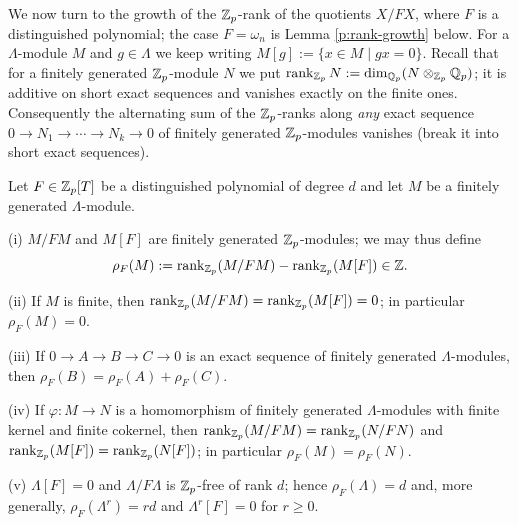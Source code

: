 We now turn to the growth of the ${\mathbb {Z}}_p$-rank of the quotients $X/FX$, where
$F$ is a distinguished polynomial; the case $F=\omega_n$ is
Lemma \ref{p:rank-growth} below.
For a $\Lambda$-module $M$ and $g\in\Lambda$ we keep writing
$M[g]:=\{x\in M\mid gx=0\}$.
Recall that for a finitely generated ${\mathbb {Z}}_p$-module $N$ we put
$\operatorname{rank}_{{\mathbb {Z}}_p}N:=\dim_{{\mathbb {Q}}_p}(N\otimes_{{\mathbb {Z}}_p}{\mathbb {Q}}_p)$; it is additive on short
exact sequences and vanishes exactly on the finite ones.
Consequently the alternating sum of the ${\mathbb {Z}}_p$-ranks along \emph{any} exact
sequence $0\to N_1\to\cdots\to N_k\to 0$ of finitely generated ${\mathbb {Z}}_p$-modules
vanishes (break it into short exact sequences).

\begin{lem}
\label{rank-euler-char}
\leanok
Let $F\in{\mathbb {Z}}_p[T]$ be a distinguished polynomial of degree $d$ and let $M$ be a
finitely generated $\Lambda$-module.

{\rm(i)} $M/FM$ and $M[F]$ are finitely generated ${\mathbb {Z}}_p$-modules; we may thus
define
$$\rho_F(M):=\operatorname{rank}_{{\mathbb {Z}}_p}(M/FM)-\operatorname{rank}_{{\mathbb {Z}}_p}(M[F])\in{\mathbb {Z}}.$$

{\rm(ii)} If $M$ is finite, then $\operatorname{rank}_{{\mathbb {Z}}_p}(M/FM)=\operatorname{rank}_{{\mathbb {Z}}_p}(M[F])=0$;
in particular $\rho_F(M)=0$.

{\rm(iii)} If $0\to A\to B\to C\to 0$ is an exact sequence of finitely generated
$\Lambda$-modules, then $\rho_F(B)=\rho_F(A)+\rho_F(C)$.

{\rm(iv)} If $\varphi:M\to N$ is a homomorphism of finitely generated
$\Lambda$-modules with finite kernel and finite cokernel, then
$\operatorname{rank}_{{\mathbb {Z}}_p}(M/FM)=\operatorname{rank}_{{\mathbb {Z}}_p}(N/FN)$ and
$\operatorname{rank}_{{\mathbb {Z}}_p}(M[F])=\operatorname{rank}_{{\mathbb {Z}}_p}(N[F])$; in particular
$\rho_F(M)=\rho_F(N)$.

{\rm(v)} $\Lambda[F]=0$ and $\Lambda/F\Lambda$ is ${\mathbb {Z}}_p$-free of rank $d$; hence
$\rho_F(\Lambda)=d$ and, more generally, $\rho_F(\Lambda^r)=rd$ and
$\Lambda^r[F]=0$ for $r\geq 0$.
\end{lem}

